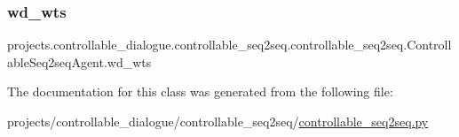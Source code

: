 \subsubsection{\texorpdfstring{wd\+\_\+wts}{wd\_wts}}
{\footnotesize\ttfamily projects.\+controllable\+\_\+dialogue.\+controllable\+\_\+seq2seq.\+controllable\+\_\+seq2seq.\+Controllable\+Seq2seq\+Agent.\+wd\+\_\+wts}



The documentation for this class was generated from the following file\+:\begin{DoxyCompactItemize}
\item 
projects/controllable\+\_\+dialogue/controllable\+\_\+seq2seq/\hyperlink{controllable__seq2seq_8py}{controllable\+\_\+seq2seq.\+py}\end{DoxyCompactItemize}
